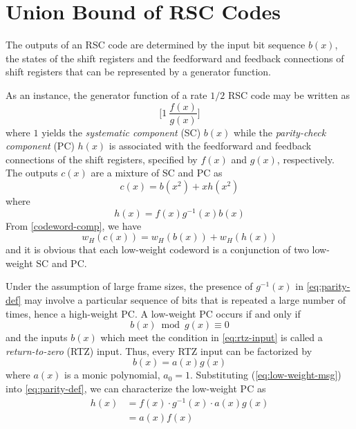 \section{Union Bound of RSC Codes}
\label{sec2}
The outputs of an RSC code are determined by the input bit sequence $b(x)$, the states of the shift registers and the feedforward and feedback connections of shift registers that can be represented by a generator function. 

As an instance,  the generator function of a rate $1/2$ RSC code may be written as  $$\Big[1 ~\frac{f(x)}{g(x)}\Big]$$ where $1$ yields the \textit{systematic  component} (SC) $b(x)$ while the \textit{parity-check component} (PC) $h(x)$ is associated with the feedforward and feedback connections of the shift registers, specified by  $f(x)$ and $g(x)$, respectively. The outputs $c(x)$ are a mixture of SC and PC as
\begin{equation}
c(x) = b(x^2)+xh(x^2)
\label{codeword-comp}
\end{equation}
where 
\begin{equation}
h(x) =f(x)g^{-1}(x)b(x)
\label{eq:parity-def}
\end{equation}
From \eqref{codeword-comp}, we have
\begin{equation}
w_H(c(x))=w_H(b(x)) + w_H(h(x))
\label{eq:cw-weight}
\end{equation}
 and it is obvious that each low-weight codeword is a conjunction of two low-weight SC and PC.

Under the assumption of large frame sizes, the presence of $g^{-1}(x)$  in \eqref{eq:parity-def} may involve a particular sequence of bits that is repeated a large number of times, hence a high-weight PC. A low-weight PC occurs if and only if
\begin{equation}
b(x) \bmod g(x) \equiv 0
\label{eq:rtz-input}
\end{equation}
and the inputs $b(x)$ which meet the condition in \eqref{eq:rtz-input} is called a \textit{return-to-zero} (RTZ) input. Thus, every RTZ input can be factorized by  
\begin{equation}
b(x) =a(x)g(x)
\label{eq:low-weight-msg}
\end{equation}
where $a(x)$ is a monic polynomial, $a_0=1$.
Substituting (\ref{eq:low-weight-msg}) into \eqref{eq:parity-def}, we can characterize the low-weight PC as
\begin{equation}
\begin{split}
h(x)&=f(x)\cdot g^{-1}(x)\cdot a(x)g(x)\\
&=a(x)f(x)
\end{split}
\label{eq:low-weight-parity}
\end{equation}

